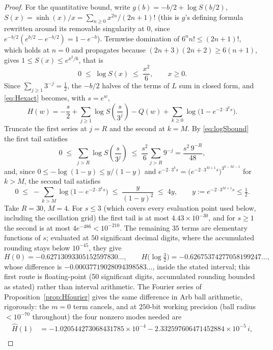 \documentclass[11pt]{amsart}
\theoremstyle{plain}
\theoremstyle{definition}
\theoremstyle{remark}
\begin{document}
\begin{proof}
For the quantitative bound, write $g(b) = -b/2 + \log S(b/2)$, $S(x) = \sinh(x)/x = \sum_{n\ge0}
x^{2n}/(2n+1)!$ (this is
$g$'s defining formula rewritten around its removable singularity at $0$, since $e^{-b/2}(e^{b/2}
- e^{-b/2}) = 1-e^{-b}$). Termwise domination of $6^n n! \le (2n+1)!$, which holds at $n=0$ and
propagates because $(2n+3)(2n+2)\ge6(n+1)$, gives $1\le S(x)\le e^{x^2/6}$, that is
\begin{equation}
\label{eq:logSbound}
0 \;\le\; \log S(x) \;\le\; \frac{x^2}{6}, \qquad x\ge0.
\end{equation}
Since $\sum_{j\ge1}3^{-j} = \tfrac12$, the $-b/2$ halves of the terms of $L$ sum in closed form, and
\eqref{eq:Hexact} becomes, with $s = e^w$,
\begin{equation}
\label{eq:Hcomputable}
H(w) = -\frac s2 + \sum_{j\ge1}\log S\!\left(\frac{s}{3^j}\right) - Q(w)
+ \sum_{k\ge0}\log\bigl(1-e^{-2\cdot3^k s}\bigr).
\end{equation}
Truncate the first series at $j=R$ and the second at $k=M$. By \eqref{eq:logSbound} the first tail
satisfies
\[
0 \;\le\; \sum_{j>R}\log S\!\left(\frac{s}{3^j}\right) \;\le\; \frac{s^2}{6}\sum_{j>R}9^{-j}
= \frac{s^2\,9^{-R}}{48},
\]
and, since $0\le-\log(1-y)\le y/(1-y)$ and $e^{-2\cdot3^ks} = \bigl(e^{-2\cdot3^{M+1}s}\bigr)^{3^{k-M-1}}$
for $k>M$, the second tail satisfies
\[
0 \;\le\; -\sum_{k>M}\log\bigl(1-e^{-2\cdot3^ks}\bigr) \;\le\; \frac{y}{(1-y)^2} \;\le\; 4y,
\qquad y:=e^{-2\cdot3^{M+1}s}\le\tfrac12 .
\]
Take $R=30$, $M=4$. For $s\le3$ (which covers every evaluation point used below, including the
oscillation grid) the first tail is at most $4.43\times10^{-30}$, and for $s\ge1$
the second is at most $4e^{-486}<10^{-210}$. The remaining $35$ terms are elementary functions of
$s$; evaluated at $50$ significant decimal digits, where the accumulated rounding stays below
$10^{-45}$, they give
\[
H(0) = -0.62713093305152597830\ldots, \qquad H\bigl(\log\tfrac32\bigr) = -0.62675374277058199247\ldots,
\]
whose difference is $-0.00037719028094398583\ldots$, inside the stated interval; this first route
is floating-point (50 significant digits, accumulated rounding bounded as stated) rather than
interval arithmetic. The Fourier series of Proposition~\ref{prop:Hfourier} gives the same
difference in Arb ball arithmetic, rigorously: the $m=0$ term cancels, and at $250$-bit working
precision (ball radius $<10^{-70}$ throughout) the four nonzero modes needed are
\begin{align*}
\hat H(1) &= -1.020544273068431785\times10^{-4} - 2.332597606471452884\times10^{-5}\,i,\\

\end{align*}
\end{proof}
\end{document}
